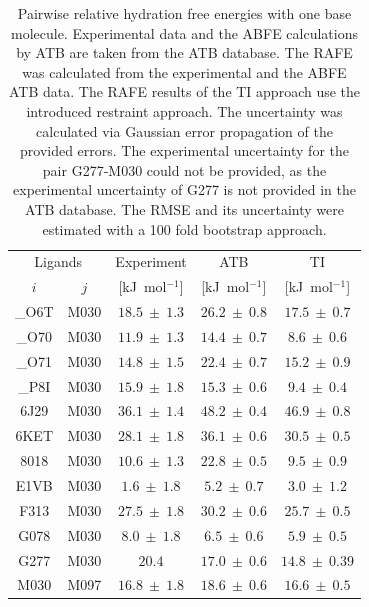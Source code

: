 \begin{table}[H]
\caption{Pairwise relative hydration free energies with one base molecule. Experimental data and the ABFE calculations by ATB are taken from the ATB database.\cite{Martin2018} The RAFE was calculated from the experimental and the ABFE ATB  data. The RAFE results of the TI approach use the introduced restraint approach. The uncertainty was calculated via Gaussian error propagation of the provided errors. The experimental uncertainty for the pair G277-M030 could not be provided, as the experimental uncertainty of G277 is not provided in the ATB database. The RMSE and its uncertainty were estimated with a 100 fold bootstrap approach.}
\begin{center}
\footnotesize
\begin{tabular}{ c c |c |c|c|}
  \multicolumn{2}{c|}{Ligands} & \multicolumn{1}{c|}{Experiment} &\multicolumn{1}{c|}{ATB}&\multicolumn{1}{c|}{TI}\\ 
    $i$ & $j$ & [kJ~mol$^{-1}$] & [kJ~mol$^{-1}$] & [kJ~mol$^{-1}$]  \\
  \hline
        \_O6T &  M030 &  $18.5 ~\pm~ 1.3$  &  $26.2 ~\pm~ 0.8$ &  $  17.5 ~\pm~ 0.7$\\
        \_O70 &  M030 &  $11.9 ~\pm~ 1.3$  &  $14.4 ~\pm~ 0.7$ &  $  8.6 ~\pm~ 0.6 $\\
        \_O71 &  M030 &  $14.8 ~\pm~ 1.5$  &  $22.4 ~\pm~ 0.7$ &  $ 15.2 ~\pm~ 0.9 $\\
        \_P8I &  M030 &  $15.9 ~\pm~ 1.8$  &  $15.3 ~\pm~ 0.6$ &  $  9.4 ~\pm~ 0.4 $\\
        6J29 &  M030 &   $36.1 ~\pm~ 1.4$  &  $48.2 ~\pm~ 0.4$ &  $ 46.9 ~\pm~ 0.8 $\\
        6KET &  M030 &   $28.1 ~\pm~ 1.8$  &  $36.1 ~\pm~ 0.6$ & $  30.5 ~\pm~ 0.5 $\\
        8018 &  M030 &   $10.6 ~\pm~ 1.3$  &  $22.8 ~\pm~ 0.5$ &  $  9.5 ~\pm~ 0.9 $\\
        E1VB &  M030 &   $ 1.6 ~\pm~ 1.8$  &  $ 5.2 ~\pm~ 0.7$ &  $ 3.0 ~\pm~ 1.2 $\\
        F313 &  M030 &   $27.5 ~\pm~ 1.8$  &  $30.2 ~\pm~ 0.6$ &  $ 25.7 ~\pm~ 0.5 $\\
        G078 &  M030 &   $ 8.0 ~\pm~ 1.8$  &  $ 6.5 ~\pm~ 0.6$ &  $  5.9 ~\pm~ 0.5 $\\
        G277 &  M030 &   $20.4 $           &  $17.0 ~\pm~ 0.6$ &  $ 14.8 ~\pm~ 0.39 $\\
        M030 &  M097 &   $16.8 ~\pm~ 1.8$  &  $18.6 ~\pm~ 0.6$ &  $ 16.6 ~\pm~ 0.5 $\\

\end{tabular}
\end{center}
\end{table}
